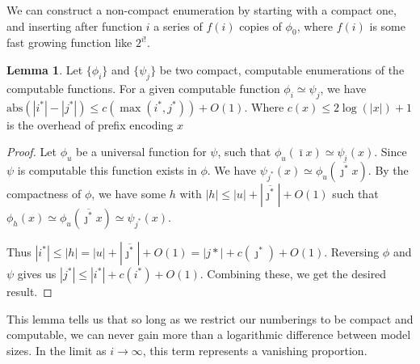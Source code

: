 \documentclass{article}
\theoremstyle{definition}
\newtheorem{lma}{Lemma}
\begin{document}
We can construct a non-compact enumeration by starting with a compact one, and inserting after function $i$ a series of $f(i)$ copies of $\phi_0$, where $f(i)$ is some fast growing function like $2^{i!}$.

\begin{lma}
Let $\{\phi_i\}$ and $\{\psi_j\}$ be two compact, computable enumerations of the computable functions. For a given computable function $\phi_i \simeq \psi_j$,  we have $\mbox{abs}(|i^*| - |j^*|) \leq c(\max(i^*, j^*)) + O(1)$. Where $c(x) \leq 2 \log(|x|) + 1$ is the overhead of prefix encoding $x$
\end{lma}
\begin{proof}
Let $\phi_u$ be a universal function for $\psi$, such that $\phi_u(\bar{\imath}x) \simeq \psi_i(x)$. Since $\psi$ is computable this function exists in $\phi$. We have $\psi_{j^*}(x) \simeq \phi_u(\overline{\jmath^*}x)$. By the compactness of $\phi$, we have some $h$ with $|h| \leq |u| + |\overline{\jmath^*}| + O(1)$ such that $\phi_{h}(x) \simeq \phi_u(\overline{\jmath^*}x) \simeq \psi_{j^*}(x)$. 

Thus $|i^*| \leq |h| = |u| + |\overline{\jmath^*}| + O(1) = |j*| + c(\jmath^*) + O(1)$. Reversing $\phi$ and $\psi$ gives us $|j^*| \leq |i^*| + c(i^*) + O(1)$. Combining these, we get the desired result.
\end{proof}

This lemma tells us that so long as we restrict our numberings to be compact and computable, we can never gain more than a logarithmic difference between model sizes. In the limit as $i \rightarrow \infty$, this term represents a vanishing proportion.
\end{document}
